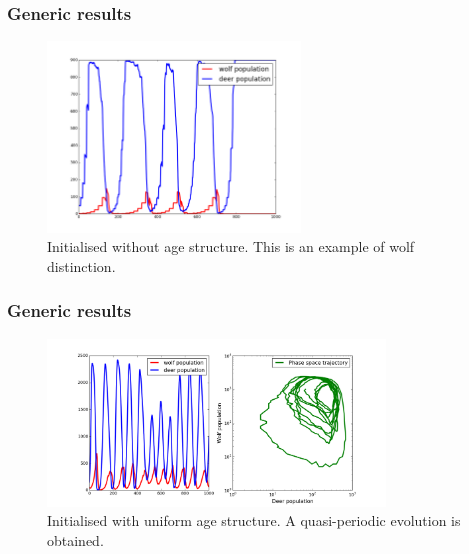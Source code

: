 \documentclass{beamer}
\begin{document}
\frame
{
	\frametitle{Generic results}

	\begin{figure}[htbp]
	\begin{center}
	\includegraphics[width=0.6\textwidth]{./pics/age_structure.png}
	\caption{Initialised without age structure. This is an example of wolf distinction.}
	\label{default}
	\end{center}
	\end{figure}
}

\frame
{
	\frametitle{Generic results}

	\begin{figure}[htbp]
	\begin{center}
	\includegraphics[width=0.8\textwidth]{./pics/phase_space.png}
	\caption{Initialised with uniform age structure. A quasi-periodic evolution is obtained.}
	\label{default}
	\end{center}
	\end{figure}
}
\end{document}
